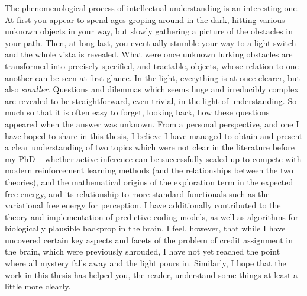 The phenomenological process of intellectual understanding is an interesting one. At first you appear to spend ages groping around in the dark, hitting various unknown objects in your way, but slowly gathering a picture of the obstacles in your path. Then, at long last, you eventually stumble your way to a light-switch and the whole vista is revealed. What were once unknown lurking obstacles are transformed into precisely specified, and tractable, objects, whose relation to one another can be seen at first glance. In the light, everything is at once clearer, but also \emph{smaller}. Questions and dilemmas which seems huge and irreducibly complex are revealed to be straightforward, even trivial, in the light of understanding. So much so that it is often easy to forget, looking back, how these questions appeared when the answer was unknown. From a personal perspective, and one I have hoped to share in this thesis, I believe I have managed to obtain and present a clear understanding of two topics which were not clear in the literature before my PhD -- whether active inference can be successfully scaled up to compete with modern reinforcement learning methods (and the relationships between the two theories), and the mathematical origins of the exploration term in the expected free energy, and its relationship to more standard functionals such as the variational free energy for perception. I have additionally contributed to the theory and implementation of predictive coding models, as well as algorithms for biologically plausible backprop in the brain. I feel, however, that while I have uncovered certain key aspects and facets of the problem of credit assignment in the brain, which were previously shrouded, I have not yet reached the point where all mystery falls away and the light pours in. Similarly, I hope that the work in this thesis has helped you, the reader, understand some things at least a little more clearly.

